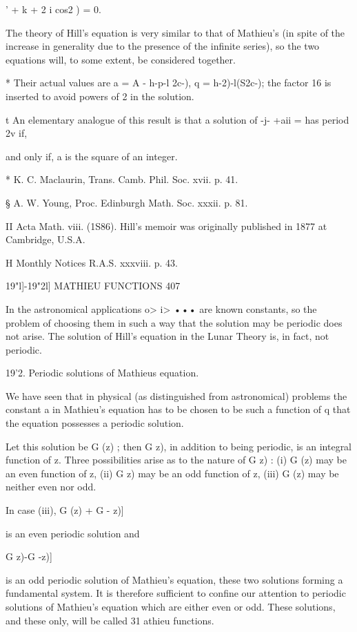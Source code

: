  ' + k + 2 i   cos2  )  = 0. 

The theory of Hill's equation is very similar to that of Mathieu's (in spite 
of the increase in generality due to the presence of the infinite series), so the 
two equations will, to some extent, be considered together. 

* Their actual values are a = A - h-p-l 2c-), q = h-2)-l(S2c-); the factor 16 is inserted to avoid 
powers of 2 in the solution. 

t An elementary analogue of this result is that a solution of -j-  +aii = has period 2v if, 

and only if, a is the square of an integer. 

* K. C. Maclaurin, Trans. Camb. Phil. Soc. xvii. p. 41. 

§ A. W. Young, Proc. Edinburgh Math. Soc. xxxii. p. 81. 

II Acta Math. viii. (1S86). Hill's memoir was originally published in 1877 at Cambridge, 
U.S.A. 

H Monthly Notices R.A.S. xxxviii. p. 43. 



19"l]-19"2l] MATHIEU FUNCTIONS 407 

In the astronomical applications  o>  i> ••• are known constants, so the 
problem of choosing them in such a way that the solution may be periodic 
does not arise. The solution of Hill's equation in the Lunar Theory is, in 
fact, not periodic. 

19'2. Periodic solutions of Mathieus equation. 

We have seen that in physical (as distinguished from astronomical) 
problems the constant a in Mathieu's equation has to be chosen to be such 
a function of q that the equation possesses a periodic solution. 

Let this solution be G (z) ; then G  z), in addition to being periodic, is an 
integral function of z. Three possibilities arise as to the nature of G  z) : 
(i) G (z) may be an even function of z, (ii) G  z) may be an odd function of z, 
(iii) G (z) may be neither even nor odd. 

In case (iii),    G (z) + G  - z)] 

is an even periodic solution and 

  G z)-G -z)] 

is an odd periodic solution of Mathieu's equation, these two solutions forming 
a fundamental system. It is therefore sufficient to confine our attention to 
periodic solutions of Mathieu's equation which are either even or odd. These 
solutions, and these only, will be called 31 athieu functions. 

